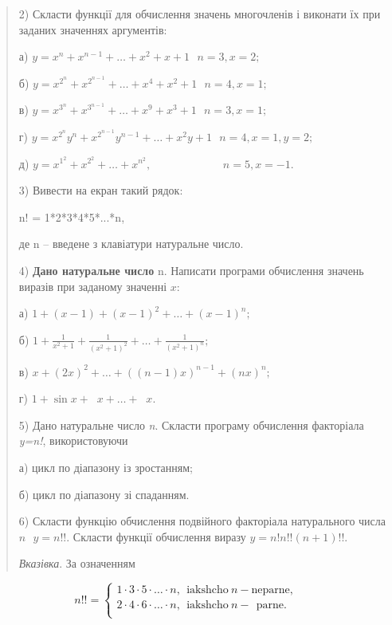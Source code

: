 \documentclass[]{article}
\begin{document}
\begin{quote}
2) Скласти функції для обчислення значень многочленів і виконати їх при
заданих значеннях аргументів:

а)
\(y = x^{n} + x^{n - 1} + \ldots + x^{2} + x + 1\mathrm{\text{\ \ \ \ \ \ \ \ \ \ \ \ \ \ \ \ \ \ \ \ }}n = 3,x = 2;\)

б)
\(y = x^{2^{n}} + x^{2^{n - 1}} + \ldots + x^{4} + x^{2} + 1\mathrm{\text{\ \ \ \ \ \ \ \ \ \ \ \ \ \ \ }}n = 4,x = 1;\)

в)
\(y = x^{3^{n}} + x^{3^{n - 1}} + \ldots + x^{9} + x^{3} + 1\mathrm{\text{\ \ \ \ \ \ \ \ \ \ \ \ \ \ \ \ }}n = 3,x = 1;\)

г)
\(y = x^{2^{n}}y^{n} + x^{2^{n - 1}}y^{n - 1} + \ldots + x^{2}y + 1\mathrm{\text{\ \ \ \ \ \ \ \ \ \ }}n = 4,x = 1,y = 2;\)

д)
\(y = x^{1^{2}} + x^{2^{2}} + \ldots + x^{n^{2}}\mathrm{,\ \ \ \ \ \ \ \ \ \ \ \ \ \ \ \ \ \ \ \ \ \ \ \ \ \ \ \ \ }n = 5,x = - 1.\)

3) Вивести на екран такий рядок:

n! = 1*2*3*4*5*...*n,

де n -- введене з клавіатури натуральне число.

4) \textbf{Дано натуральне число} \(\text{n.}\) Написати програми
обчислення значень виразів при заданому значенні \(x\):

а) \(1 + (x - 1) + (x - 1)^{2} + \ldots + (x - 1)^{n};\)

б)
\(1 + \frac{1}{x^{2} + 1} + \frac{1}{(x^{2} + 1)^{2}} + \ldots + \frac{1}{(x^{2} + 1)^{n}};\)

в) \(x + (2x)^{2} + \ldots + ((n - 1)x)^{n - 1} + (nx)^{n};\)

г) \(1 + \sin x + \operatorname{}x + \ldots + \operatorname{}x.\)

5) Дано натуральне число \emph{n}. Скласти програму обчислення
факторіала \emph{y=n!}, використовуючи

а) цикл по діапазону із зростанням;

б) цикл по діапазону зі спаданням.

6) Скласти функцію обчислення подвійного факторіала натурального числа
\(n\mathrm{\text{\ \ }}y = n!!.\) Скласти функції обчислення виразу
\(y = n!n!!(n + 1)!!.\)

\emph{\emph{Вказівка}}. За означенням
\end{quote}

\[n!! = \left\{ \begin{matrix}
1 \cdot 3 \cdot 5 \cdot \ldots \cdot n,\mathrm{\ \ iakshcho\ }n - \mathrm{neparne,} \\
2 \cdot 4 \cdot 6 \cdot \ldots \cdot n,\mathrm{\ \ iakshcho\ }n - \mathrm{\ \ parne.} \\
\end{matrix} \right.\ \]
\end{document}
